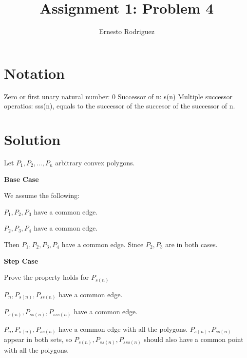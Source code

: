 \documentclass{article}
\title{Assignment 1: Problem 4}
\author{Ernesto Rodriguez}
\begin{document}
\maketitle

\section{Notation}

Zero or first unary natural number: 0
Successor of n: s(n)
Multiple successor operatios: sss(n), equals to the successor of the succesor of the successor of n.

\section{Solution}

Let $P_1,P_2,...,P_n$ arbitrary convex polygons.

{\bf Base Case} 

We assume the following:
\begin{itemize}
  {\item $P_1,P_2,P_3$ have a common edge.}
  {\item $P_2,P_3,P_4$ have a common edge.}

\end{itemize}

Then $P_1,P_2,P_3,P_4$ have a common edge. Since $P_2,P_3$ are in both cases.

{\bf Step Case}

Prove the property holds for $P_{s(n)}$
\begin{itemize}
  {\item $P_n,P_{s(n)},P_{ss(n)}$ have a common edge.}
  {\item $P_{s(n)},P_{ss(n)},P_{sss(n)}$ have a common edge.}
\end{itemize}

$P_n,P_{s(n)},P_{ss(n)}$ have a common edge with all the polygons. $P_{s(n)},P_{ss(n)}$ appear in both sets, so $P_{s(n)},P_{ss(n)},P_{sss(n)}$ should also have a common point with all the polygons.
  
\end{document}
